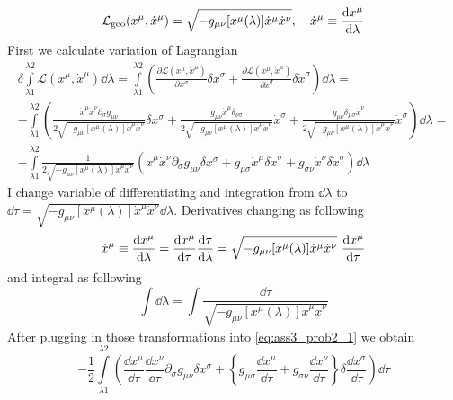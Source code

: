 \begin{equation}
    \mathcal{L}_{\text{geo}}(x^\mu,\dot{x}^\mu) =
    \sqrt{-g_{\mu\nu}[x^\mu(\lambda)]\dot{x}^\mu\dot{x}^\nu}, \quad
    \dot{x}^{\mu} \equiv \frac{\operatorname{d\!} x^\mu}{\dd\lambda}
\end{equation}
%
First we calculate variation of Lagrangian
%
\begin{multline}
    \delta\int\limits_{\lambda1}^{\lambda2}\mathcal{L}(x^\mu,\dot{x}^\mu)\dd\lambda =
    \int\limits_{\lambda1}^{\lambda2}
    \left(\frac{\partial\mathcal{L}(x^\mu,\dot{x}^\mu)}{\partial x^\sigma}\delta x^\sigma +
    \frac{\partial\mathcal{L}(x^\mu,\dot{x}^\mu)}{\partial \dot{x}^\sigma}\delta \dot{x}^\sigma\right)\dd\lambda = \\
    -\int\limits_{\lambda1}^{\lambda2}
    \left(\frac{\dot{x}^\mu\dot{x}^\nu \partial_\sigma g_{\mu\nu}}{2\sqrt{-g_{\mu\nu}[x^\mu(\lambda)]\dot{x}^\mu\dot{x}^\nu}}\delta x^\sigma +
    \frac{g_{\mu\nu}\dot{x}^\mu\delta_{\nu\sigma}}{2\sqrt{-g_{\mu\nu}[x^\mu(\lambda)]\dot{x}^\mu\dot{x}^\nu}} \dot{x}^\sigma +
    \frac{g_{\mu\nu}\delta_{\mu\sigma}\dot{x}^\nu}{2\sqrt{-g_{\mu\nu}[x^\mu(\lambda)]\dot{x}^\mu\dot{x}^\nu}} \dot{x}^\sigma\right)\dd\lambda = \\
    -\int\limits_{\lambda1}^{\lambda2}\frac{1}{2\sqrt{-g_{\mu\nu}[x^\mu(\lambda)]\dot{x}^\mu\dot{x}^\nu}}
    \left(\dot{x}^\mu\dot{x}^\nu \partial_\sigma g_{\mu\nu} \delta x^\sigma +
    g_{\mu\sigma}\dot{x}^\mu \delta \dot{x}^\sigma +
    g_{\sigma\nu}\dot{x}^\nu \delta \dot{x}^\sigma \right)\dd\lambda
    \label{eq:ass3_prob2_1}
\end{multline}
%
I change variable of differentiating and integration from $\dd\lambda$ to
$\dd\tau = \sqrt{-g_{\mu\nu}[x^\mu(\lambda)]\dot{x}^\mu\dot{x}^\nu}\dd\lambda$.
Derivatives changing as following
%
\begin{equation}
    \dot{x}^{\mu} \equiv \frac{\operatorname{d\!} x^\mu}{\dd\lambda} =
    \frac{\operatorname{d\!} x^\mu}{\dd\tau} \frac{\dd\tau}{\dd\lambda} =
    \sqrt{-g_{\mu\nu}[x^\mu(\lambda)]\dot{x}^\mu\dot{x}^\nu}~\frac{\operatorname{d\!} x^\mu}{\dd\tau}
\end{equation}
%
and integral as following
%
\begin{equation}
    \int\dd\lambda =
    \int\frac{\dd\tau}{\sqrt{-g_{\mu\nu}[x^\mu(\lambda)]\dot{x}^\mu\dot{x}^\nu}}
\end{equation}
%
After plugging in those transformations into \autoref{eq:ass3_prob2_1} we obtain
%
\begin{equation}
    -\frac{1}{2}\int\limits_{\lambda1}^{\lambda2}
    \left(\frac{\dd x^\mu}{\dd\tau}\frac{\dd x^\nu}{\dd\tau} \partial_\sigma g_{\mu\nu} \delta x^\sigma +
    \left\{g_{\mu\sigma}\frac{\dd x^\mu}{\dd\tau} +
    g_{\sigma\nu}\frac{\dd x^\nu}{\dd\tau}\right\} \delta \frac{\dd x^\sigma}{\dd\tau} \right)\dd\tau
    \label{eq:ass3_prob2_2}
\end{equation}
